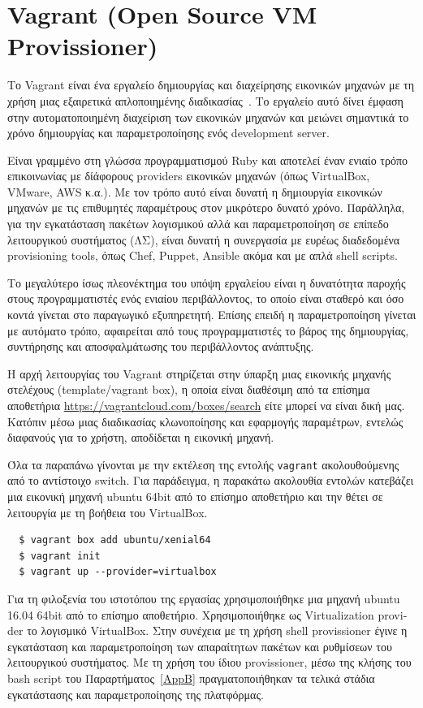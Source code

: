 \documentclass[12pt]{report}
\begin{document}
\section{\textlatin{\textlatin{Vagrant (Open Source VM Provissioner)}}}\label{vagrant}
Το \textlatin{Vagrant} είναι ένα εργαλείο δημιουργίας και διαχείρησης εικονικών μηχανών με τη χρήση μιας εξαιρετικά απλοποιημένης διαδικασίας~\cite{vagrant_by_hashicorp}. Το εργαλείο αυτό δίνει έμφαση στην αυτοματοποιημένη διαχείριση των εικονικών μηχανών και μειώνει σημαντικά το χρόνο δημιουργίας και παραμετροποίησης ενός \textlatin{development server}.

Είναι γραμμένο στη γλώσσα προγραμματισμού \textlatin{Ruby} και αποτελεί έναν ενιαίο τρόπο επικοινωνίας με δίάφορους \textlatin{providers} εικονικών μηχανών (όπως \textlatin{VirtualBox, VMware, AWS} κ.α.). Με τον τρόπο αυτό είναι δυνατή η δημιουργία εικονικών μηχανών με τις επιθυμητές παραμέτρους στον μικρότερο δυνατό χρόνο. Παράλληλα, για την εγκατάσταση πακέτων λογισμικού αλλά και παραμετροποίηση σε επίπεδο λειτουργικού συστήματος (ΛΣ), είναι δυνατή η συνεργασία με ευρέως διαδεδομένα \textlatin{provisioning tools}, όπως \textlatin{Chef, Puppet, Ansible} ακόμα και με απλά \textlatin{shell scripts}.

Το μεγαλύτερο ίσως πλεονέκτημα του υπόψη εργαλείου είναι η δυνατότητα παροχής στους προγραμματιστές ενός ενιαίου περιβάλλοντος, το οποίο είναι σταθερό και όσο κοντά γίνεται στο παραγωγικό εξυπηρετητή. Επίσης επειδή η παραμετροποίηση γίνεται με αυτόματο τρόπο, αφαιρείται από τους προγραμματιστές το βάρος της δημιουργίας, συντήρησης και αποσφαλμάτωσης του περιβάλλοντος ανάπτυξης.

Η αρχή λειτουργίας του \textlatin{Vagrant} στηρίζεται στην ύπαρξη μιας εικονικής μηχανής στελέχους (\textlatin{template/vagrant box}), η οποία είναι διαθέσιμη από τα επίσημα αποθετήρια \textlatin{\url{https://vagrantcloud.com/boxes/search}} είτε μπορεί να είναι δική μας. Κατόπιν μέσω μιας διαδικασίας κλωνοποίησης και εφαρμογής παραμέτρων, εντελώς διαφανούς για το χρήστη, αποδίδεται η εικονική μηχανή.

Όλα τα παραπάνω γίνονται με την εκτέλεση της εντολής \textlatin{\texttt{vagrant}} ακολουθούμενης από το αντίστοιχο \textlatin{switch}. Για παράδειγμα, η παρακάτω ακολουθία εντολών κατεβάζει μια εικονική μηχανή \textlatin{ubuntu 64bit} από το επίσημο αποθετήριο και την θέτει σε λειτουργία με τη βοήθεια του \textlatin{VirtualBox}.
\begin{Verbatim}
  $ vagrant box add ubuntu/xenial64
  $ vagrant init
  $ vagrant up --provider=virtualbox
\end{Verbatim}
Για τη φιλοξενία του ιστοτόπου της εργασίας χρησιμοποιήθηκε μια μηχανή \textlatin{ubuntu 16.04 64bit} από το επίσημο αποθετήριο. Xρησιμοποιήθηκε ως \textlatin{Virtualization provider} το λογισμικό \textlatin{VirtualBox}. Στην συνέχεια με τη χρήση \textlatin{shell provissioner} έγινε η εγκατάσταση και παραμετροποίηση των απαραίτητων πακέτων και ρυθμίσεων του λειτουργικού συστήματος. Με τη χρήση του ίδιου \textlatin{provissioner}, μέσω της κλήσης του \textlatin{bash script} του Παραρτήματος~\ref{AppB} πραγματοποιήθηκαν τα τελικά στάδια εγκατάστασης και παραμετροποίησης της πλατφόρμας.
\end{document}
